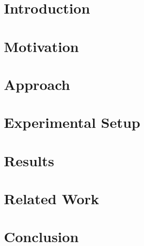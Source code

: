 
\section{Introduction}
\label{sec:introduction}


\section{Motivation}
\label{sec:motivation}


\section{Approach}
\label{sec:accelresSharAlgo}


\section{Experimental Setup}
\label{sec:experimentalsetup}


\section{Results}
\label{sec:results}


\section{Related Work}
\label{sec:relatedwork}


\section{Conclusion}
\label{sec:conclusion}
